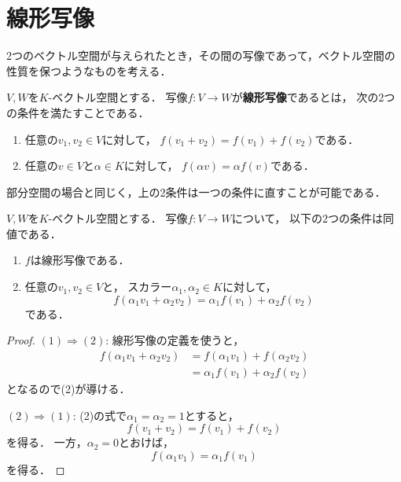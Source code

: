 \section{線形写像}
2つのベクトル空間が与えられたとき，その間の写像であって，ベクトル空間の性質を保つようなものを考える．
\begin{dfn}
    $V,W$を$K$-ベクトル空間とする．
    写像$f\colon V \to W$が\textbf{線形写像}であるとは，
    次の2つの条件を満たすことである．
    \begin{enumerate}
        \item 任意の$v_1,v_2 \in V$に対して，
        $f(v_1 + v_2) = f(v_1) + f(v_2)$である．
        \item 任意の$v \in V$と$\alpha \in K$に対して，
        $f(\alpha v) = \alpha f(v)$である．
    \end{enumerate}
\end{dfn}
部分空間の場合と同じく，上の2条件は一つの条件に直すことが可能である．
\begin{prop}\label{prop:linear_one_condition}
    $V,W$を$K$-ベクトル空間とする．
    写像$f\colon V \to W$について，
    以下の2つの条件は同値である．
    \begin{enumerate}
        \item $f$は線形写像である．
        \item 任意の$v_1,v_2 \in V$と，
        スカラー$\alpha_1,\alpha_2 \in K$に対して，
        \[
            f(\alpha_1 v_1 + \alpha_2 v_2) %
            = \alpha_1 f(v_1) + \alpha_2 f(v_2)
        \]
        である．
    \end{enumerate}
\end{prop}
\begin{proof}
    $(1) \Rightarrow (2)$: 線形写像の定義を使うと，
    \[
        \begin{aligned}
            f(\alpha_1 v_1 + \alpha_2 v_2) %
            &= f(\alpha_1 v_1) + f(\alpha_2 v_2) \\
            &= \alpha_1 f(v_1) + \alpha_2 f(v_2)
        \end{aligned}
    \]
    となるので(2)が導ける．
    
    $(2) \Rightarrow (1)$: (2)の式で$\alpha_1 = \alpha_2 = 1$とすると，
    \[
        f(v_1 + v_2) = f(v_1) + f(v_2)
    \]
    を得る．
    一方，$\alpha_2 = 0$とおけば，
    \[
        f(\alpha_1 v_1) = \alpha_1 f(v_1)
    \]
    を得る．
\end{proof}
